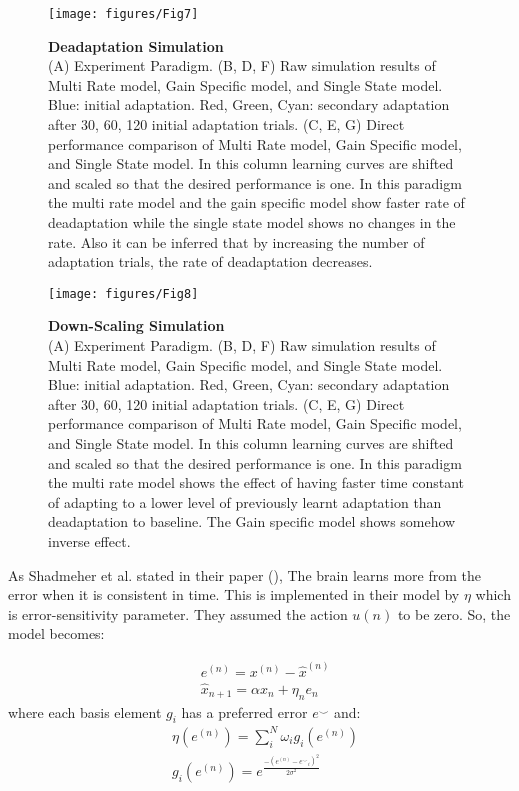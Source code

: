 \documentclass[9pt,twocolumn]{paper-template}
\begin{document}
\begin{figure}[h!]
  \centering
     \texttt{[image: figures/Fig7]}
  \caption{\textbf{Deadaptation Simulation}\\ (A)  Experiment Paradigm. (B, D, F) Raw simulation results of Multi Rate model, Gain Specific model, and Single State model. Blue: initial adaptation. Red, Green, Cyan: secondary adaptation after 30, 60, 120 initial adaptation trials. (C, E, G) Direct performance comparison of Multi Rate model, Gain Specific model, and Single State model. In this column learning curves are shifted and scaled so that the desired performance is one. In this paradigm the multi rate model and the gain specific model show faster rate of deadaptation while the single state model shows no changes in the rate. Also it can be inferred that by increasing the number of adaptation trials, the rate of deadaptation decreases. 
}
  \label{fig:Deadaptation_Simulation}
\end{figure}


\begin{figure}[h!]
  \centering
     \texttt{[image: figures/Fig8]}
  \caption{\textbf{Down-Scaling Simulation}\\ (A)  Experiment Paradigm. (B, D, F) Raw simulation results of Multi Rate model, Gain Specific model, and Single State model. Blue: initial adaptation. Red, Green, Cyan: secondary adaptation after 30, 60, 120 initial adaptation trials. (C, E, G) Direct performance comparison of Multi Rate model, Gain Specific model, and Single State model. In this column learning curves are shifted and scaled so that the desired performance is one. In this paradigm the multi rate model shows the effect of having faster time constant of adapting to a lower level of previously learnt adaptation than deadaptation to baseline. The Gain specific model shows somehow inverse effect.
}
  \label{fig:Down_Scaling_Simulation}
\end{figure}




As Shadmeher et al. stated in their paper (\cite{mem_error}), The brain learns more from the error when it is consistent in time. This is implemented in their model by $\eta$ which is error-sensitivity parameter. They assumed the action $u(n)$ to be zero. So, the model becomes:

\begin{eqnarray*}
& e^{(n)} = x^{(n)}-\hat{x}^{(n)}\\
& \hat{x}_{n+1} = \alpha \hat{x}_n + \eta_ne_n
\end{eqnarray*}
where  each basis element $g_i$ has a preferred error $e^\smallsmile$ and:
\begin{eqnarray*}
& \eta(e^{(n)}) = \sum_i^N \omega_ig_i(e^{(n)})\\
&g_i(e^{(n)}) = e^{\frac{-(e^{(n)}-{e^\smallsmile}_i)^2}{2\sigma^2}}
\end{eqnarray*}
\end{document}
